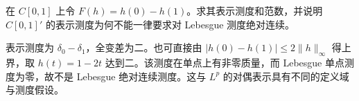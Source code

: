 \begin{exercise}
在 $C[0,1]$ 上令 $F(h)=h(0)-h(1)$。求其表示测度和范数，并说明 $C[0,1]'$ 的表示测度为何不能一律要求对 Lebesgue 测度绝对连续。
\end{exercise}
\begin{solution}
表示测度为 $\delta_0-\delta_1$，全变差为二。也可直接由 $|h(0)-h(1)|\le2\|h\|_\infty$ 得上界，取 $h(t)=1-2t$ 达到二。该测度在单点上有非零质量，而 Lebesgue 单点测度为零，故不是 Lebesgue 绝对连续测度。这与 $L^p$ 的对偶表示具有不同的定义域与测度假设。
\end{solution}
